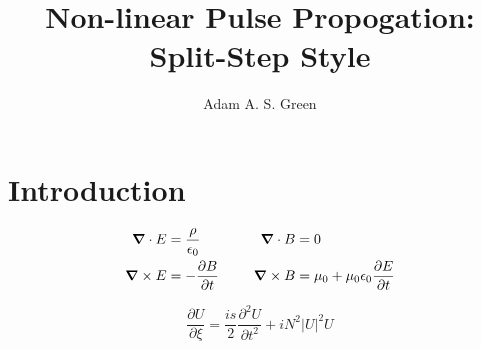\documentclass[12pt]{article}
\title{Non-linear Pulse Propogation: Split-Step Style}
\author{Adam A. S. Green}
\newcommand{\gv}[1]{\ensuremath{\mbox{\boldmath$ #1 $}}}
\renewcommand{\div}[1]{\gv{\nabla} \cdot #1} %
\newcommand{\curl}[1]{\gv{\nabla} \times #1} %
\newcommand{\pd}[2]{\frac{\partial #1}{\partial #2}}
\newcommand{\pdd}[2]{\frac{\partial^2 #1}{\partial #2^2}}
\begin{document}

\maketitle
\section{Introduction}
\begin{alignat}{2}
       \div{E} &= \frac{\rho}{\epsilon_0} &\qquad \div{B} &=0\\
       \curl{E} &=- \pd{B}{t}  & \curl{B} &= \mu_0 + \mu_0 \epsilon_0 \pd{E}{t} 
       \end{alignat}

\begin{equation}
\pd{U}{\xi}= \frac{is}{2} \pdd{U}{t} + i N^2 |U|^2U 
\end{equation}
\end{document}
